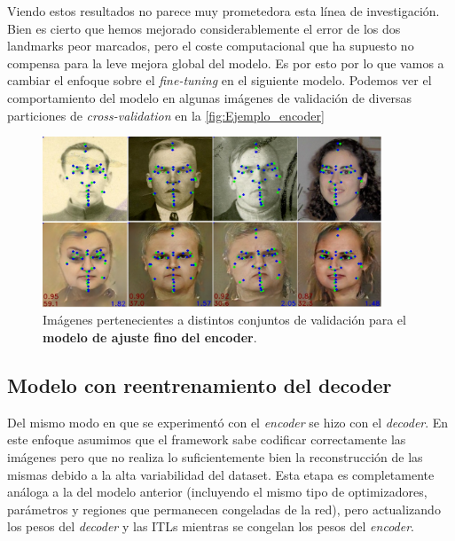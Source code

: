     \medskip

    \noindent Viendo estos resultados no parece muy prometedora esta línea de investigación. Bien es cierto que hemos mejorado considerablemente el error de los dos landmarks peor marcados, pero el coste computacional que ha supuesto no compensa para la leve mejora global del modelo. Es por esto por lo que vamos a cambiar el enfoque sobre el \textit{fine-tuning} en el siguiente modelo. Podemos ver el comportamiento del modelo en algunas imágenes de validación de diversas particiones de \textit{cross-validation} en la \autoref{fig:Ejemplo_encoder}

    \begin{figure}[H]
        \centering
        \includegraphics[width=0.9\textwidth]{img/image_encoder.png}
        \caption{Imágenes pertenecientes a distintos conjuntos de validación para el \textbf{modelo de ajuste fino del encoder}.}
        \label{fig:Ejemplo_encoder}
    \end{figure}

    \subsection{Modelo con reentrenamiento del decoder}
        \noindent Del mismo modo en que se experimentó con el \textit{encoder} se hizo con el \textit{decoder}. En este enfoque asumimos que el framework sabe codificar correctamente las imágenes pero que no realiza lo suficientemente bien la reconstrucción de las mismas debido a la alta variabilidad del dataset. Esta etapa es completamente análoga a la del modelo anterior (incluyendo el mismo tipo de optimizadores, parámetros y regiones que permanecen congeladas de la red), pero actualizando los pesos del \textit{decoder} y las ITLs mientras se congelan los pesos del \textit{encoder}.

